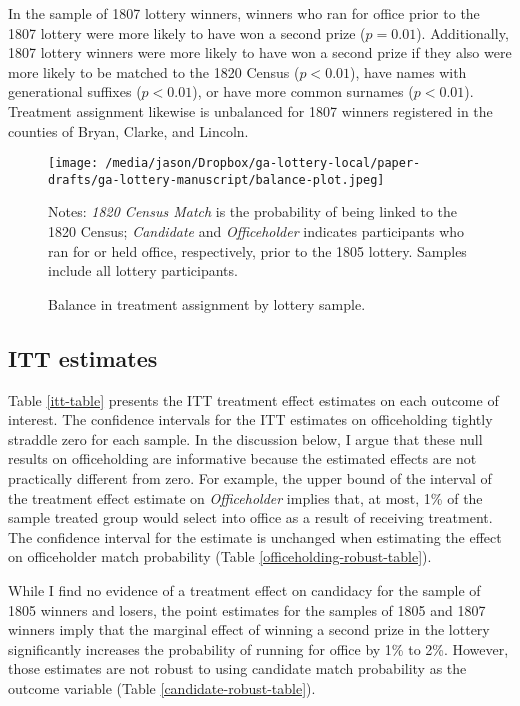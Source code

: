In the sample of 1807 lottery winners, winners who ran for office prior to the 1807 lottery were more likely to have won a second prize ($p = 0.01$). Additionally, 1807 lottery winners were more likely to have won a second prize if they also were more likely to be matched to the 1820 Census ($p < 0.01$), have names with generational suffixes ($p < 0.01$), or have more common surnames ($p < 0.01$). Treatment assignment likewise is unbalanced for 1807 winners registered in the counties of Bryan, Clarke, and Lincoln. 

\begin{figure}[htbp]
	\caption{Balance in treatment assignment by lottery sample.\label{balance-plot}}
	\begin{center}
		\texttt{[image: /media/jason/Dropbox/ga-lottery-local/paper-drafts/ga-lottery-manuscript/balance-plot.jpeg]} 
	\end{center}
	\footnotesize{Notes: \textit{1820 Census Match} is the probability of being linked to the 1820 Census;  \textit{Candidate} and \textit{Officeholder} indicates participants who ran for or held office, respectively, prior to the 1805 lottery. Samples include all lottery participants.}
\end{figure}

\subsection{ITT estimates}

Table \ref{itt-table} presents the ITT treatment effect estimates on each outcome of interest. The confidence intervals for the ITT estimates on officeholding tightly straddle zero for each sample. In the discussion below, I argue that these null results on officeholding are informative because the estimated effects are not practically different from zero. For example, the upper bound of the interval of the treatment effect estimate on \textit{Officeholder} implies that, at most, 1\% of the sample treated group would select into office as a result of receiving treatment. The confidence interval for the estimate is unchanged when estimating the effect on officeholder match probability (Table \ref{officeholding-robust-table}). 

While I find no evidence of a treatment effect on candidacy for the sample of 1805 winners and losers, the point estimates for the samples of 1805 and 1807 winners imply that the marginal effect of winning a second prize in the lottery significantly increases the probability of running for office by 1\% to 2\%. However, those estimates are not robust to using candidate match probability as the outcome variable (Table \ref{candidate-robust-table}). 

